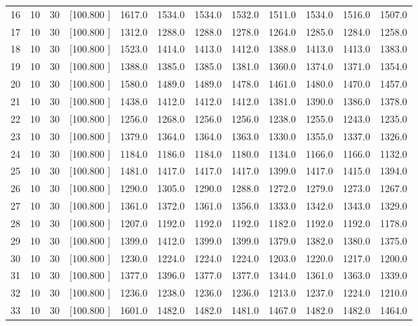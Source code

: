 \documentclass[12pt,a4paper]{article}
\begin{document}
\begin{center}
{\begin{tabular}{r r r r r r r r r r r r}
  16& 10& 30&[100.800   ]&  1617.0&  1534.0&  1534.0&  1532.0&  1511.0&  1534.0&  1516.0&  1507.0\\[-0.02in]
  17& 10& 30&[100.800   ]&  1312.0&  1288.0&  1288.0&  1278.0&  1264.0&  1285.0&  1284.0&  1258.0\\[-0.02in]
  18& 10& 30&[100.800   ]&  1523.0&  1414.0&  1413.0&  1412.0&  1388.0&  1413.0&  1413.0&  1383.0\\[-0.02in]
  19& 10& 30&[100.800   ]&  1388.0&  1385.0&  1385.0&  1381.0&  1360.0&  1374.0&  1371.0&  1354.0\\[-0.02in]
  20& 10& 30&[100.800   ]&  1580.0&  1489.0&  1489.0&  1478.0&  1461.0&  1480.0&  1470.0&  1457.0\\[-0.02in]
  21& 10& 30&[100.800   ]&  1438.0&  1412.0&  1412.0&  1412.0&  1381.0&  1390.0&  1386.0&  1378.0\\[-0.02in]
  22& 10& 30&[100.800   ]&  1256.0&  1268.0&  1256.0&  1256.0&  1238.0&  1255.0&  1243.0&  1235.0\\[-0.02in]
  23& 10& 30&[100.800   ]&  1379.0&  1364.0&  1364.0&  1363.0&  1330.0&  1355.0&  1337.0&  1326.0\\[-0.02in]
  24& 10& 30&[100.800   ]&  1184.0&  1186.0&  1184.0&  1180.0&  1134.0&  1166.0&  1166.0&  1132.0\\[-0.02in]
  25& 10& 30&[100.800   ]&  1481.0&  1417.0&  1417.0&  1417.0&  1399.0&  1417.0&  1415.0&  1394.0\\[-0.02in]
  26& 10& 30&[100.800   ]&  1290.0&  1305.0&  1290.0&  1288.0&  1272.0&  1279.0&  1273.0&  1267.0\\[-0.02in]
  27& 10& 30&[100.800   ]&  1361.0&  1372.0&  1361.0&  1356.0&  1333.0&  1342.0&  1343.0&  1329.0\\[-0.02in]
  28& 10& 30&[100.800   ]&  1207.0&  1192.0&  1192.0&  1192.0&  1182.0&  1192.0&  1192.0&  1178.0\\[-0.02in]
  29& 10& 30&[100.800   ]&  1399.0&  1412.0&  1399.0&  1399.0&  1379.0&  1382.0&  1380.0&  1375.0\\[-0.02in]
  30& 10& 30&[100.800   ]&  1230.0&  1224.0&  1224.0&  1224.0&  1203.0&  1220.0&  1217.0&  1200.0\\[-0.02in]
  31& 10& 30&[100.800   ]&  1377.0&  1396.0&  1377.0&  1377.0&  1344.0&  1361.0&  1363.0&  1339.0\\[-0.02in]
  32& 10& 30&[100.800   ]&  1236.0&  1238.0&  1236.0&  1236.0&  1213.0&  1237.0&  1224.0&  1210.0\\[-0.02in]
  33& 10& 30&[100.800   ]&  1601.0&  1482.0&  1482.0&  1481.0&  1467.0&  1482.0&  1482.0&  1464.0\\[-0.02in]

\end{tabular}}
\end{center}
\end{document}

